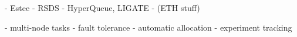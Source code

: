 - Estee
- RSDS
- HyperQueue, LIGATE
- (ETH stuff)

- multi-node tasks
- fault tolerance
- automatic allocation
- experiment tracking
